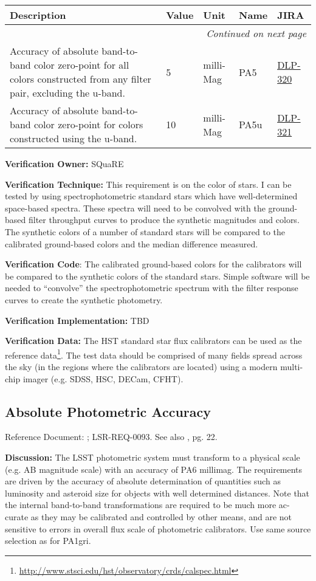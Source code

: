 \documentclass[DM,lsstdraft,toc]{lsstdoc}
\makeatletter
\newcommand{\jira}[1]{\href{https://jira.lsstcorp.org/browse/#1}{#1}}
\newenvironment{metric}[0]{%
\setlength\LTleft{0pt}
\setlength\LTright{\fill}
\begin{longtable}[]{@{}p{0.4\textwidth}lp{0.75in}p{1.3in}p{0.75in}@{}}

\hline \textbf{Description} & \textbf{Value} & \textbf{Unit} & \textbf{Name} & \textbf{JIRA} \\ \hline
\endhead

\hline \multicolumn{5}{r}{\emph{Continued on next page}} \\
\endfoot

\hline\hline
\endlastfoot
}{%
\hline
\end{longtable}
}
\makeatother
\begin{document}
\begin{metric}
Accuracy of absolute band-to-band color zero-point for all colors
constructed from any filter pair, excluding the u-band. & 5 & milli-Mag
& PA5 & \jira{DLP-320}\tabularnewline
Accuracy of absolute band-to-band color zero-point for colors
constructed using the u-band. & 10 & milli-Mag & PA5u &
\jira{DLP-321}\tabularnewline
\end{metric}

\textbf{Verification Owner:} SQuaRE

\textbf{Verification Technique:} This requirement is on the color of
stars. I can be tested by using spectrophotometric standard stars which
have well-determined space-based spectra. These spectra will need to be
convolved with the ground-based filter throughput curves to produce the
synthetic magnitudes and colors. The synthetic colors of a number of
standard stars will be compared to the calibrated ground-based colors
and the median difference measured.

\textbf{Verification Code}: The calibrated ground-based colors for the
calibrators will be compared to the synthetic colors of the standard
stars. Simple software will be needed to ``convolve'' the
spectrophotometric spectrum with the filter response curves to create
the synthetic photometry.

\textbf{Verification Implementation:} TBD

\textbf{Verification Data:} The HST standard star flux calibrators can
be used as the reference data\footnote{\url{http://www.stsci.edu/hst/observatory/crds/calspec.html}}. The test data
should be comprised of many fields spread across the sky (in the regions
where the calibrators are located) using a modern multi-chip imager
(e.g. SDSS, HSC, DECam, CFHT).

\subsection{Absolute Photometric
Accuracy}\label{absolute-photometric-accuracy}

Reference Document: ; LSR-REQ-0093. See also \SRD, pg. 22.

\textbf{Discussion:} The LSST photometric system must transform to a
physical scale (e.g. AB magnitude scale) with an accuracy of PA6
millimag. The requirements are driven by the accuracy of absolute
determination of quantities such as luminosity and asteroid size for
objects with well determined distances. Note that the internal
band-to-band transformations are required to be much more ac- curate as
they may be calibrated and controlled by other means, and are not
sensitive to errors in overall flux scale of photometric calibrators.
Use same source selection as for PA1gri.
\end{document}

